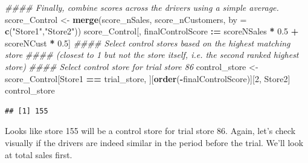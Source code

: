 \documentclass[
]{article}
\newenvironment{Shaded}{\begin{snugshade}}{\end{snugshade}}
\newcommand{\CommentTok}[1]{\textcolor[rgb]{0.56,0.35,0.01}{\textit{#1}}}
\newcommand{\DataTypeTok}[1]{\textcolor[rgb]{0.13,0.29,0.53}{#1}}
\newcommand{\DecValTok}[1]{\textcolor[rgb]{0.00,0.00,0.81}{#1}}
\newcommand{\ErrorTok}[1]{\textcolor[rgb]{0.64,0.00,0.00}{\textbf{#1}}}
\newcommand{\FloatTok}[1]{\textcolor[rgb]{0.00,0.00,0.81}{#1}}
\newcommand{\KeywordTok}[1]{\textcolor[rgb]{0.13,0.29,0.53}{\textbf{#1}}}
\newcommand{\NormalTok}[1]{#1}
\newcommand{\OperatorTok}[1]{\textcolor[rgb]{0.81,0.36,0.00}{\textbf{#1}}}
\newcommand{\StringTok}[1]{\textcolor[rgb]{0.31,0.60,0.02}{#1}}
\begin{document}
\begin{Shaded}
\begin{Highlighting}[]
\CommentTok{#### Finally, combine scores across the drivers using a simple average.}
\NormalTok{score_Control <-}\StringTok{ }\KeywordTok{merge}\NormalTok{(score_nSales, score_nCustomers, }\DataTypeTok{by =} \KeywordTok{c}\NormalTok{(}\StringTok{"Store1"}\NormalTok{,}\StringTok{"Store2"}\NormalTok{))}
\NormalTok{score_Control[, finalControlScore }\OperatorTok{:}\ErrorTok{=}\StringTok{ }\NormalTok{scoreNSales }\OperatorTok{*}\StringTok{ }\FloatTok{0.5} \OperatorTok{+}\StringTok{ }\NormalTok{scoreNCust }\OperatorTok{*}\StringTok{ }\FloatTok{0.5}\NormalTok{]}
\CommentTok{#### Select control stores based on the highest matching store}
\CommentTok{#### (closest to 1 but not the store itself, i.e. the second ranked highest store)}
\CommentTok{#### Select control store for trial store 86}
\NormalTok{control_store <-}\StringTok{ }\NormalTok{score_Control[Store1 }\OperatorTok{==}\StringTok{ }\NormalTok{trial_store,}
\NormalTok{][}\KeywordTok{order}\NormalTok{(}\OperatorTok{-}\NormalTok{finalControlScore)][}\DecValTok{2}\NormalTok{, Store2]}
\NormalTok{control_store}
\end{Highlighting}
\end{Shaded}

\begin{verbatim}
## [1] 155
\end{verbatim}

Looks like store 155 will be a control store for trial store 86. Again,
let's check visually if the drivers are indeed similar in the period
before the trial. We'll look at total sales first.
\end{document}
